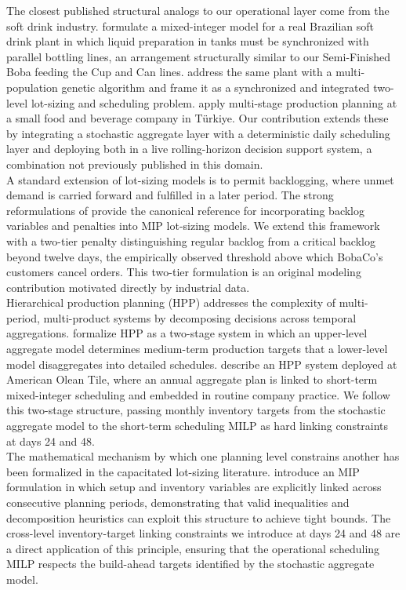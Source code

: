 \documentclass[11pt]{article}
\begin{document}
\indent The closest published structural analogs to our operational layer come from the soft drink industry. \cite{ferreira2009softdrink} formulate a mixed-integer model for a real Brazilian soft drink plant in which liquid preparation in tanks must be synchronized with parallel bottling lines, an arrangement structurally similar to our Semi-Finished Boba feeding the Cup and Can lines. \cite{toledo2009sitlsp} address the same plant with a multi-population genetic algorithm and frame it as a synchronized and integrated two-level lot-sizing and scheduling problem. \cite{turkmen2021} apply multi-stage production planning at a small food and beverage company in Türkiye. Our contribution extends these by integrating a stochastic aggregate layer with a deterministic daily scheduling layer and deploying both in a live rolling-horizon decision support system, a combination not previously published in this domain.\\
\indent A standard extension of lot-sizing models is to permit backlogging, where unmet demand is carried forward and fulfilled in a later period. The strong reformulations of \cite{PochetWolsey1988} provide the canonical reference for incorporating backlog variables and penalties into MIP lot-sizing models. We extend this framework with a two-tier penalty distinguishing regular backlog from a critical backlog beyond twelve days, the empirically observed threshold above which BobaCo's customers cancel orders. This two-tier formulation is an original modeling contribution motivated directly by industrial data.\\
\indent Hierarchical production planning (HPP) addresses the complexity of multi-period, multi-product systems by decomposing decisions across temporal aggregations. \cite{bitran1982hpp} formalize HPP as a two-stage system in which an upper-level aggregate model determines medium-term production targets that a lower-level model disaggregates into detailed schedules. \cite{liberatore1985hpp} describe an HPP system deployed at American Olean Tile, where an annual aggregate plan is linked to short-term mixed-integer scheduling and embedded in routine company practice. We follow this two-stage structure, passing monthly inventory targets from the stochastic aggregate model to the short-term scheduling MILP as hard linking constraints at days 24 and 48.\\
\indent The mathematical mechanism by which one planning level constrains another has been formalized in the capacitated lot-sizing literature. \cite{suerie2003clspl} introduce an MIP formulation in which setup and inventory variables are explicitly linked across consecutive planning periods, demonstrating that valid inequalities and decomposition heuristics can exploit this structure to achieve tight bounds. The cross-level inventory-target linking constraints we introduce at days 24 and 48 are a direct application of this principle, ensuring that the operational scheduling MILP respects the build-ahead targets identified by the stochastic aggregate model.\\
\end{document}
